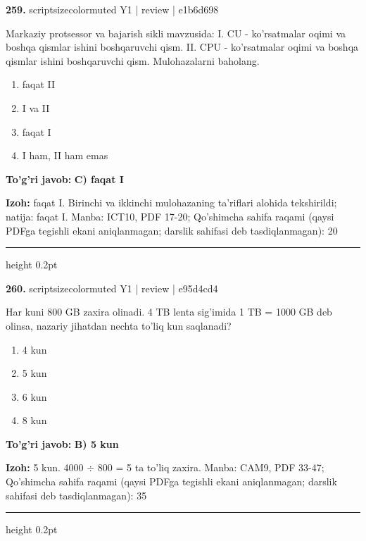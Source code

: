 \documentclass[10pt,a4paper]{article}
\begin{document}
{\bfseries\sffamily\color{ink} 259.} {scriptsizecolor{muted} Y1 | review | e1b6d698}
\par
Markaziy protsessor va bajarish sikli mavzusida: I. CU - ko'rsatmalar oqimi va boshqa qismlar ishini boshqaruvchi qism. II. CPU - ko'rsatmalar oqimi va boshqa qismlar ishini boshqaruvchi qism. Mulohazalarni baholang.
\begin{enumerate}[label=\Alph*),leftmargin=9mm]
\item faqat II
\item I va II
\item faqat I
\item I ham, II ham emas
\end{enumerate}
\begin{tcolorbox}[enhanced,breakable,colback=teal!4,colframe=teal!60!black,boxrule=0.45pt,arc=1.2mm,left=2.7mm,right=2.7mm,top=1.8mm,bottom=1.8mm,before skip=2mm,after skip=2mm]
{\bfseries\sffamily\color{teal}To'g'ri javob:} \textbf{C) faqat I}
\par\smallskip
{\bfseries Izoh:} faqat I. Birinchi va ikkinchi mulohazaning ta'riflari alohida tekshirildi; natija: faqat I. Manba: ICT10, PDF 17-20; Qo'shimcha sahifa raqami (qaysi PDFga tegishli ekani aniqlanmagan; darslik sahifasi deb tasdiqlanmagan): 20
\end{tcolorbox}
\vspace{2mm}\hrule height 0.2pt\vspace{3mm}

{\bfseries\sffamily\color{ink} 260.} {scriptsizecolor{muted} Y1 | review | e95d4cd4}
\par
Har kuni 800 GB zaxira olinadi. 4 TB lenta sig'imida 1 TB = 1000 GB deb olinsa, nazariy jihatdan nechta to'liq kun saqlanadi?
\begin{enumerate}[label=\Alph*),leftmargin=9mm]
\item 4 kun
\item 5 kun
\item 6 kun
\item 8 kun
\end{enumerate}
\begin{tcolorbox}[enhanced,breakable,colback=teal!4,colframe=teal!60!black,boxrule=0.45pt,arc=1.2mm,left=2.7mm,right=2.7mm,top=1.8mm,bottom=1.8mm,before skip=2mm,after skip=2mm]
{\bfseries\sffamily\color{teal}To'g'ri javob:} \textbf{B) 5 kun}
\par\smallskip
{\bfseries Izoh:} 5 kun. 4000 \ensuremath{\div} 800 = 5 ta to'liq zaxira. Manba: CAM9, PDF 33-47; Qo'shimcha sahifa raqami (qaysi PDFga tegishli ekani aniqlanmagan; darslik sahifasi deb tasdiqlanmagan): 35
\end{tcolorbox}
\vspace{2mm}\hrule height 0.2pt\vspace{3mm}
\end{document}

